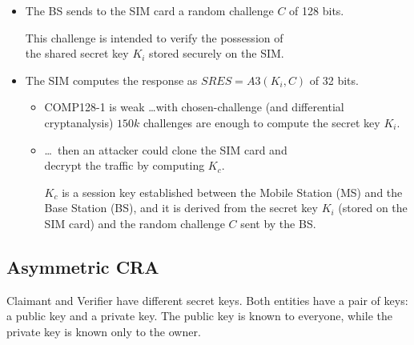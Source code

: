 \begin{itemize}
    \item The BS sends to the SIM card a random challenge $C$ of 128 bits. 
    
    \hspace*{1cm} This challenge is intended to verify the possession of \\ \hspace*{3cm} the shared secret key  $K_i$  stored securely on the SIM.
    \item The SIM computes the response as $SRES = A3(K_{i}, C)$ of 32 bits.
    \begin{itemize}
        \item COMP128-1 is weak \dots with chosen-challenge (and differential cryptanalysis) $150k$ challenges are enough to compute the secret key $K_i$.
        \item \dots\ then an attacker could clone the SIM card and \\\hspace*{4cm} decrypt the traffic by computing $K_c$.
        
        $K_c$  is a session key established between the Mobile Station (MS) and the Base Station (BS), and it is derived from the secret key  $K_i$  (stored on the SIM card) and the random challenge $C$  sent by the BS.
    \end{itemize}
\end{itemize}

\subsection{Asymmetric CRA}
Claimant and Verifier have different secret keys. Both entities have a pair of keys: a public key and a private key. The public key is known to everyone, while the private key is known only to the owner.

